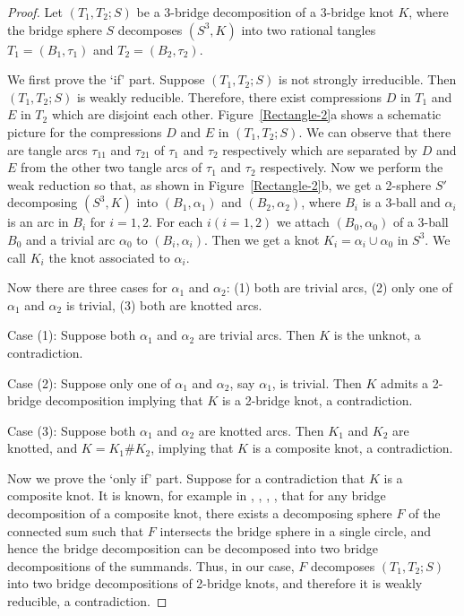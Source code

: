 \documentclass[12pt]{amsart}
\begin{document}
\begin{proof}
Let $(T_1, T_2;S)$ be a 3-bridge decomposition of a 3-bridge knot $K$, where
the bridge sphere $S$ decomposes $(S^3, K)$ into two rational tangles $T_1=(B_1, \tau_1)$ and
$T_2=(B_2, \tau_2)$.


We first prove the `if' part. Suppose $(T_1, T_2;S)$ is not strongly irreducible.
Then $(T_1, T_2;S)$ is weakly reducible. Therefore, there exist compressions $D$ in $T_1$ and $E$ in $T_2$ which are disjoint
each other.
Figure~\ref{Rectangle-2}a shows a schematic picture for the compressions $D$ and $E$ in $(T_1, T_2;S)$.
We can observe that there are tangle arcs $\tau_{11}$ and $\tau_{21}$ of $\tau_1$ and $\tau_2$ respectively which are
separated by $D$ and $E$ from the other two tangle arcs of $\tau_1$ and $\tau_2$ respectively.
Now we perform the weak reduction so that, as shown in Figure~\ref{Rectangle-2}b, we get a 2-sphere $S'$ decomposing $(S^3, K)$ into
$(B_1, \alpha_1)$ and $(B_2, \alpha_2)$, where $B_i$ is a 3-ball and $\alpha_i$ is an arc in $B_i$ for $i=1,2$.
For each $i (i=1,2)$ we attach $(B_0, \alpha_0)$ of a 3-ball $B_0$ and a trivial arc $\alpha_0$ to $(B_i, \alpha_i)$.
Then we get a knot $K_i=\alpha_i\cup \alpha_0$ in $S^3$. We call $K_i$ the knot associated to $\alpha_i$.


Now there are three cases for $\alpha_1$ and $\alpha_2$: (1) both are trivial arcs, (2) only one of $\alpha_1$ and $\alpha_2$ is trivial, (3) both are knotted arcs.

Case (1): Suppose both $\alpha_1$ and $\alpha_2$ are trivial arcs. Then $K$ is the unknot, a contradiction.

Case (2): Suppose only one of $\alpha_1$ and $\alpha_2$, say $\alpha_1$, is trivial. Then $K$ admits a 2-bridge
decomposition implying that $K$ is a 2-bridge knot, a contradiction.

Case (3): Suppose both $\alpha_1$ and $\alpha_2$ are knotted arcs. Then $K_1$ and $K_2$ are knotted, and $K=K_1 \# K_2$,
implying that $K$ is a composite knot, a contradiction.


Now we prove the `only if' part. Suppose for a contradiction that $K$ is a composite knot. It is known, for example
in \cite{Sb54}, \cite{D92}, \cite{HS01}, \cite{Sl03}, that
for any bridge decomposition of a composite knot, there exists a decomposing sphere $F$ of
the connected sum such that $F$ intersects the bridge sphere in a single circle, and hence the
bridge decomposition can be decomposed into two bridge decompositions of the summands.
Thus, in our case, $F$ decomposes $(T_1, T_2; S)$ into two bridge decompositions of
2-bridge knots, and therefore it is weakly reducible, a contradiction.
\end{proof}
\end{document}

